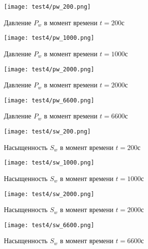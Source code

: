 \begin{figure}
  \begin{center}
    \begin{minipage}[h]{0.49\textwidth}
       \texttt{[image: test4/pw\_200.png]}
       \vspace{1cm}
       \caption{Давление $P_w$ в момент времени $t=200$с}
       \label{t4_pic_start}
    \end{minipage}
    \hfill
    \begin{minipage}[h]{0.49\textwidth}
       \texttt{[image: test4/pw\_1000.png]}
       \vspace{1cm}
       \caption{Давление $P_w$ в момент времени $t=1000$с}
    \end{minipage}
    \vspace{3cm}
    \vfill
    \begin{minipage}[h]{0.49\textwidth}
       \texttt{[image: test4/pw\_2000.png]}
       \vspace{1cm}
       \caption{Давление $P_w$ в момент времени $t=2000$с}
    \end{minipage}
    \hfill
    \begin{minipage}[h]{0.49\textwidth}
       \texttt{[image: test4/pw\_6600.png]}
       \vspace{1cm}
       \caption{Давление $P_w$ в момент времени $t=6600$с}
    \end{minipage}
    \hfill  
  \end{center}
\end{figure}

\begin{figure}
  \begin{center}
    \begin{minipage}[h]{0.49\textwidth}
       \texttt{[image: test4/sw\_200.png]}
       \vspace{1cm}
       \caption{Насыщенность $S_w$ в момент времени $t=200$с}
    \end{minipage}
    \hfill
    \begin{minipage}[h]{0.49\textwidth}
       \texttt{[image: test4/sw\_1000.png]}
       \vspace{1cm}
       \caption{Насыщенность $S_w$ в момент времени $t=1000$с}
    \end{minipage}
    \vspace{3cm}
    \vfill
    \begin{minipage}[h]{0.49\textwidth}
       \texttt{[image: test4/sw\_2000.png]}
       \vspace{1cm}
       \caption{Насыщенность $S_w$ в момент времени $t=2000$с}
    \end{minipage}
    \hfill
    \begin{minipage}[h]{0.49\textwidth}
       \texttt{[image: test4/sw\_6600.png]}
       \vspace{1cm}
       \caption{Насыщенность $S_w$ в момент времени $t=6600$с}
    \end{minipage}
    \hfill  
  \end{center}
\end{figure}

